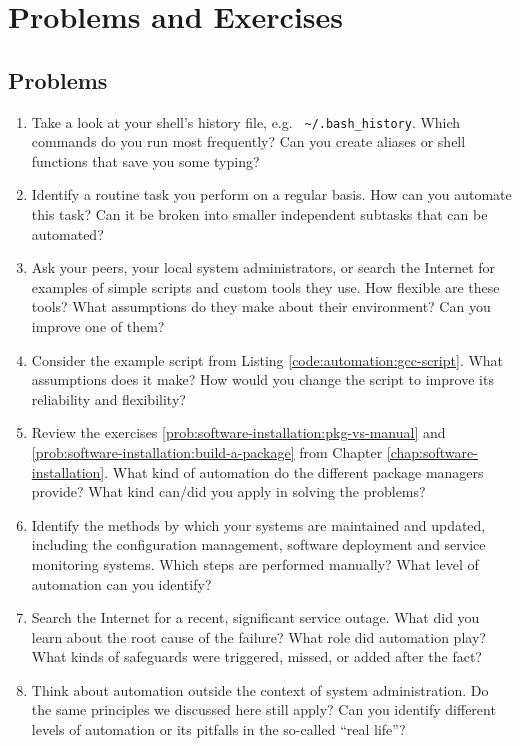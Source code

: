 \vfill
\pagebreak

\chapter*{Problems and Exercises}
\section*{Problems}

\begin{enumerate}

\item
\label{prob:automation:frequently-used}
Take a look at your shell's history file, e.g. {\tt
\~{}/.bash\_history}.  Which commands do you run most
frequently?  Can you create aliases or shell functions
that save you some typing?

\item
\label{prob:automation:routine}
Identify a routine task you perform on a regular
basis.  How can you automate this task?  Can it be
broken into smaller independent subtasks that can be
automated?

\item
Ask your peers, your local system administrators, or
search the Internet for examples of simple scripts and
custom tools they use.  How flexible are these tools?
What assumptions do they make about their environment?
Can you improve one of them?

\item
\label{prob:automation:improve-script}
Consider the example script from Listing
\ref{code:automation:gcc-script}.  What assumptions
does it make?  How would you change the script to
improve its reliability and flexibility?

\item
Review the exercises
\ref{prob:software-installation:pkg-vs-manual} and
\ref{prob:software-installation:build-a-package} from
Chapter \ref{chap:software-installation}.  What kind
of automation do the different package managers
provide?  What kind can/did you apply in solving the
problems?

\item
Identify the methods by which your systems are
maintained and updated, including the configuration
management, software deployment and service monitoring
systems.  Which steps are performed manually?  What
level of automation can you identify?

\item
Search the Internet for a recent, significant service
outage.  What did you learn about the root cause of
the failure?  What role did automation play?  What
kinds of safeguards were triggered, missed, or added
after the fact?

\item
Think about automation outside the context of system
administration.  Do the same principles we discussed
here still apply?  Can you identify different levels
of automation or its pitfalls in the so-called ``real
life''?

\end{enumerate}

